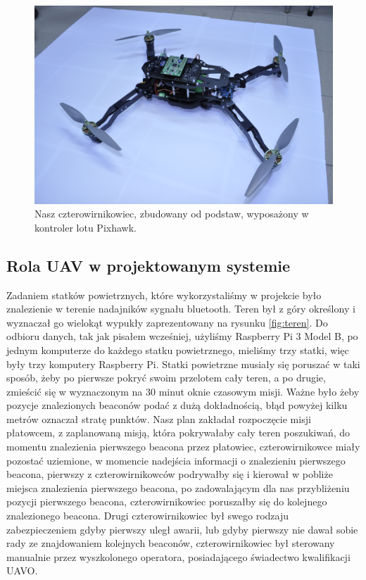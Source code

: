 \begin{figure}[!th]
    \centering
    \includegraphics[width=15cm]{zalaczniki/obrazy/dron_czarny.jpg}
    \caption{Nasz czterowirnikowiec, zbudowany od podstaw, wyposażony w kontroler lotu Pixhawk.}
    \label{fig:dronczarny}
\end{figure}


\subsection{Rola UAV w projektowanym systemie}

Zadaniem statków powietrznych, które wykorzystaliśmy w projekcie było znalezienie w terenie nadajników sygnału bluetooth. Teren był z góry określony i wyznaczał go wielokąt wypukły zaprezentowany na rysunku \ref{fig:teren}. Do odbioru danych, tak jak pisałem wcześniej, użyliśmy Raspberry Pi 3 Model B, po jednym komputerze do każdego statku powietrznego, mieliśmy trzy statki, więc były trzy komputery Raspberry Pi. Statki powietrzne musiały się poruszać w taki sposób, żeby po pierwsze pokryć swoim przelotem cały teren, a po drugie, zmieścić się w wyznaczonym na 30 minut oknie czasowym misji. Ważne było żeby pozycje znalezionych beaconów podać z dużą dokładnością, błąd powyżej kilku metrów oznaczał stratę punktów. Nasz plan zakładał rozpoczęcie misji płatowcem, z zaplanowaną misją, która pokrywałaby cały teren poszukiwań, do momentu znalezienia pierwszego beacona przez płatowiec, czterowirnikowce miały pozostać uziemione, w momencie nadejścia informacji o znalezieniu pierwszego beacona, pierwszy z czterowirnikowców podrywałby się i kierował w pobliże miejsca znalezienia pierwszego beacona, po zadowalającym dla nas przybliżeniu pozycji pierwszego beacona, czterowirnikowiec poruszałby się do kolejnego znalezionego beacona. Drugi czterowirnikowiec był swego rodzaju zabezpieczeniem gdyby pierwszy uległ awarii, lub gdyby pierwszy nie dawał sobie rady ze znajdowaniem kolejnych beaconów, czterowirnikowiec był sterowany manualnie przez wyszkolonego operatora, posiadającego świadectwo kwalifikacji UAVO. 

